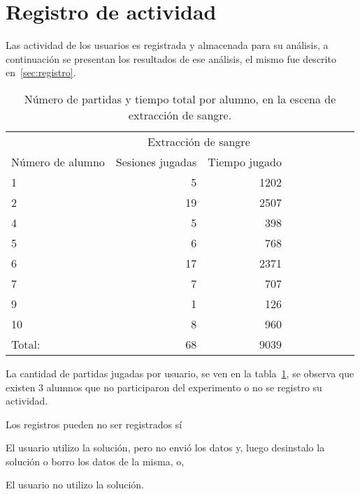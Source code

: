 \section{Registro de actividad}


Las actividad de los usuarios es registrada y almacenada para su análisis, a
continuación se presentan los resultados de ese análisis, el mismo fue descrito
en~\ref{sec:registro}.


\begin{table}[!hbt]
\centering
\begin{tabular}{lrrrrrrrr}
\toprule
                   & \multicolumn{2}{c}{Extracción de sangre} \\
                   \cmidrule(lr){2-3} 
Número de alumno   & Sesiones jugadas                            & Tiempo jugado \\
\midrule
 1       & 5  & 1202 \\
 2       & 19 & 2507 \\
 4       & 5  & 398  \\
 5       & 6  & 768  \\
 6       & 17 & 2371 \\
 7       & 7  & 707  \\
 9       & 1  & 126  \\
10       & 8  & 960  \\
\midrule
Total:   & 68 & 9039 \\
\bottomrule
\end{tabular}
\caption{Número de partidas y tiempo total por alumno, en la escena de
    extracción de sangre.}
\label{tab:log_hemocultivo_partida}
\end{table}

La cantidad de partidas jugadas por usuario, se ven en la
tabla~\ref{tab:log_hemocultivo_partida}, se observa que existen 3 alumnos que no
participaron del experimento o no se registro su actividad.

Los registros pueden no ser registrados sí
\begin{enumerate*}[label=\itshape\alph*\upshape)]
    \item El usuario utilizo la solución, pero no envió los datos y, luego
        desinstalo la solución o borro los datos de la misma, o,
    \item El usuario no utilizo la solución.
\end{enumerate*}

